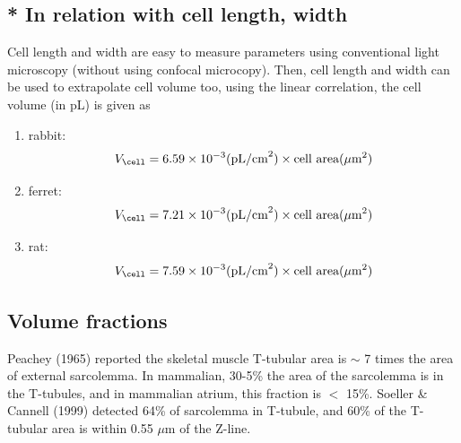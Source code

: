 \subsection{* In relation with cell length, width}

Cell length and width are easy to measure parameters using conventional light
microscopy (without using confocal microcopy). Then, cell length and width can
be used to extrapolate cell volume too, using the linear correlation, the cell
volume (in pL) is given as
\begin{enumerate}
\item rabbit:
\begin{equation}
  \label{eq:1439}
  V_\cell = 6.59\times 10^{-3} (\text{pL/cm}^2) \times \text{cell area} (\mu\text{m}^2)
\end{equation}
\item ferret:
\begin{equation}
  \label{eq:1440}
  V_\cell = 7.21\times 10^{-3} (\text{pL/cm}^2) \times \text{cell area} (\mu\text{m}^2)
\end{equation}
\item rat:
\begin{equation}
  \label{eq:1441}
  V_\cell = 7.59\times 10^{-3} (\text{pL/cm}^2) \times \text{cell area} (\mu\text{m}^2)
\end{equation}
\end{enumerate}

\subsection{Volume fractions}
\label{sec:volume-fractions}

Peachey (1965) reported the skeletal muscle T-tubular area is $\sim$ 7 times the
area of external sarcolemma. In mammalian, 30-5\% the area of the sarcolemma is
in the T-tubules, and in mammalian atrium, this fraction is $<$ 15\%. Soeller \&
Cannell (1999) detected 64\% of sarcolemma in T-tubule, and 60\% of the
T-tubular area is within 0.55 $\mu$m of the Z-line.



